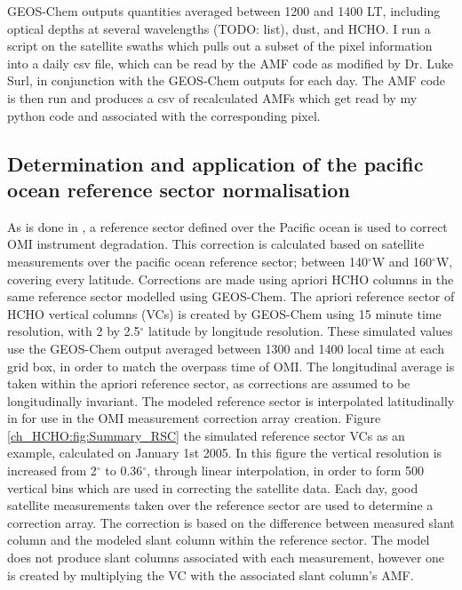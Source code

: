    GEOS-Chem outputs quantities averaged between 1200 and 1400 LT, including optical depths at several wavelengths (TODO: list), dust, and HCHO.
   I run a script on the satellite swaths which pulls out a subset of the pixel information into a daily csv file, which can be read by the AMF code as modified by Dr. Luke Surl, in conjunction with the GEOS-Chem outputs for each day.
   The AMF code is then run and produces a csv of recalculated AMFs which get read by my python code and associated with the corresponding pixel.
    
  \subsection{Determination and application of the pacific ocean reference sector normalisation}
    \label{ch_HCHO:sec:RSC}

    As is done in \citet{Abad2015}, a reference sector defined over the Pacific ocean is used to correct OMI instrument degradation.
    This correction is calculated based on satellite measurements over the pacific ocean reference sector; between 140$^{\circ}$W and 160$^{\circ}$W, covering every latitude.
    Corrections are made using apriori HCHO columns in the same reference sector modelled using GEOS-Chem.
    The apriori reference sector of HCHO vertical columns (VCs) is created by GEOS-Chem using 15 minute time resolution, with 2 by 2.5$^{\circ}$ latitude by longitude resolution.
    These simulated values use the GEOS-Chem output averaged between 1300 and 1400 local time at each grid box, in order to match the overpass time of OMI.
    The longitudinal average is taken within the apriori reference sector, as corrections are assumed to be longitudinally invariant.
    The modeled reference sector is interpolated latitudinally in for use in the OMI measurement correction array creation.
    Figure \ref{ch_HCHO:fig:Summary_RSC} the simulated reference sector VCs as an example, calculated on January 1st 2005.
    In this figure the vertical resolution is increased from 2$^{\circ}$ to 0.36$^{\circ}$, through linear interpolation, in order to form 500 vertical bins which are used in correcting the satellite data.
    Each day, good satellite measurements taken over the reference sector are used to determine a correction array.
    The correction is based on the difference between measured slant column and the modeled slant column within the reference sector.
    The model does not produce slant columns associated with each measurement, however one is created by multiplying the VC with the associated slant column's AMF.
    
